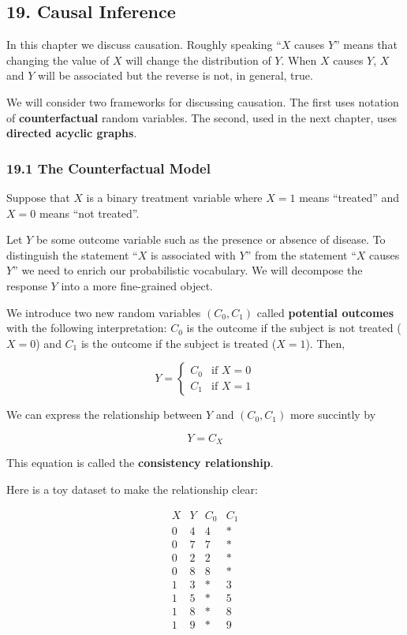 \subsection{19. Causal Inference}\label{causal-inference}

In this chapter we discuss causation. Roughly speaking ``\(X\) causes
\(Y\)'' means that changing the value of \(X\) will change the
distribution of \(Y\). When \(X\) causes \(Y\), \(X\) and \(Y\) will be
associated but the reverse is not, in general, true.

We will consider two frameworks for discussing causation. The first uses
notation of \textbf{counterfactual} random variables. The second, used
in the next chapter, uses \textbf{directed acyclic graphs}.

\subsubsection{19.1 The Counterfactual Model}\label{the-counterfactual-model}

Suppose that \(X\) is a binary treatment variable where \(X = 1\) means
``treated'' and \(X = 0\) means ``not treated''.

Let \(Y\) be some outcome variable such as the presence or absence of
disease. To distinguish the statement ``\(X\) is associated with \(Y\)''
from the statement ``\(X\) causes \(Y\)'' we need to enrich our
probabilistic vocabulary. We will decompose the response \(Y\) into a
more fine-grained object.

We introduce two new random variables \((C_0, C_1)\) called
\textbf{potential outcomes} with the following interpretation: \(C_0\)
is the outcome if the subject is not treated (\(X = 0\)) and \(C_1\) is
the outcome if the subject is treated (\(X = 1\)). Then,

\[ Y = \begin{cases}
C_0 & \text{if } X = 0 \\
C_1 & \text{if } X = 1
\end{cases}\]

We can express the relationship between \(Y\) and \((C_0, C_1)\) more
succintly by

\[ Y = C_X \]

This equation is called the \textbf{consistency relationship}.

Here is a toy dataset to make the relationship clear:

\[
\begin{array}{cccc}
X & Y & C_0 & C_1 \\
\hline
0 & 4 & 4 & * \\
0 & 7 & 7 & * \\
0 & 2 & 2 & * \\
0 & 8 & 8 & * \\
\hline
1 & 3 & * & 3 \\
1 & 5 & * & 5 \\
1 & 8 & * & 8 \\
1 & 9 & * & 9
\end{array}
\]


